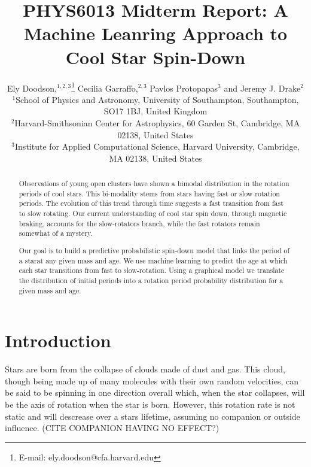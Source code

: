 \documentclass[fleqn,usenatbib]{mnras}
\title{PHYS6013 Midterm Report: A Machine Leanring Approach to Cool Star Spin-Down}
\author[E. Doodson et al.]{
Ely Doodson,$^{1,2,3}$\thanks{E-mail: ely.doodson@cfa.harvard.edu}
Cecilia Garraffo,$^{2,3}$
Pavlos Protopapas$^{3}$
and Jeremy J. Drake$^{2}$
\\
$^{1}$School of Physics and Astronomy, University of Southampton,
Southampton, SO17 1BJ, United Kingdom\\
$^{2}$Harvard-Smithsonian Center for Astrophysics, 60 Garden St, Cambridge, MA 02138, United States \\
$^{3}$Institute for Applied Computational Science, Harvard University, Cambridge, MA 02138, United States
}
\begin{document}
\label{firstpage}
\pagerange{\pageref{firstpage}--\pageref{lastpage}}
\maketitle

\begin{abstract}
	Observations of young open clusters have shown a bimodal distribution in the rotation
	periods of cool stars.
	This bi-modality stems from stars having fast or slow rotation periods.
	The evolution of this trend through time suggests a fast transition from fast to slow rotating.
	Our current understanding of cool star spin down, through magnetic braking, accounts for the slow-rotators branch, while the fast rotators remain somewhat of a mystery.

	Our goal is to build a predictive probabilistic spin-down model that links the period of a starat any given mass and age.
	We use machine learning to predict the age at which each star transitions from fast to slow-rotation.
	Using a graphical model we translate the distribution of initial periods into a rotation period probability distribution for a given mass and age.
\end{abstract}


\section{Introduction}
Stars are born from the collapse of clouds made of dust and gas.
This cloud, though being made up of many molecules with their own random velocities, can be said to be spinning in one direction overall which, when the star collapses, will be the axis of rotation when the star is born.
However, this rotation rate is not static and will descrease over a stars lifetime, assuming no companion or outside influence. (CITE COMPANION HAVING NO EFFECT?)
\end{document}
